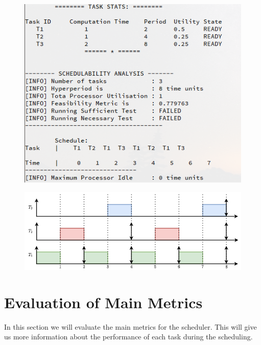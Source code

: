 \begin{figure}[!ht]
\centering
\begin{minipage}{.5\textwidth}
  \centering
  \includegraphics[width=\linewidth]{../imgs/sim-test3}
  \label{fig:case3-output}
\end{minipage}%
\begin{minipage}{.5\textwidth}
  \centering
  \includegraphics[width=\linewidth]{../imgs/sim-result-case-3}
  \label{fig:case3-schedule}
\end{minipage}
\end{figure}
\pagebreak
\section{Evaluation of Main Metrics}\label{sec:main-metrics}
 In this section we will evaluate the main metrics for the scheduler. This will give us more information about the performance of each task during the scheduling.\\

